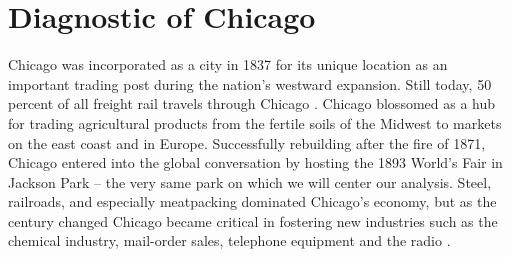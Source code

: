 \documentclass[12pt]{article}
\begin{document}
\section{Diagnostic of Chicago}

Chicago was incorporated as a city in 1837 for its unique location as an important trading post during the nation's westward expansion. Still today, 50 percent of all freight rail travels through Chicago \citep{chicagohistory}. Chicago blossomed as a hub for trading agricultural products from the fertile soils of the Midwest to markets on the east coast and in Europe. Successfully rebuilding after the fire of 1871, Chicago entered into the global conversation by hosting the 1893 World's Fair in Jackson Park -- the very same park on which we will center our analysis. Steel, railroads, and especially meatpacking dominated Chicago's economy, but as the century changed Chicago became critical in fostering new industries such as the chemical industry, mail-order sales, telephone equipment and the radio \citep{chicagobrit}. 
\end{document}
